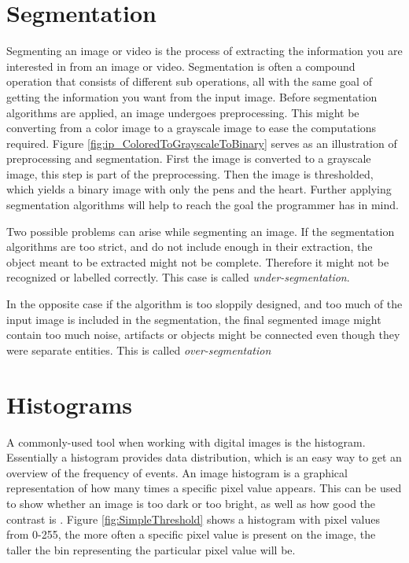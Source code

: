
\section{Segmentation}

Segmenting an image or video is the process of extracting the information you are interested in from an image or video. Segmentation is often a compound operation that consists of different sub operations, all with the same goal of getting the information you want from the input image. Before segmentation algorithms are applied, an image undergoes preprocessing. This might be converting from a color image to a grayscale image to ease the computations required. Figure \ref{fig:ip_ColoredToGrayscaleToBinary} serves as an illustration of preprocessing and segmentation. First the image is converted to a grayscale image, this step is part of the preprocessing. Then the image is thresholded, which yields a binary image with only the pens and the heart. Further applying segmentation algorithms will help to reach the goal the programmer has in mind.

Two possible problems can arise while segmenting an image. If the segmentation algorithms are too strict, and do not include enough in their extraction, the object meant to be extracted might not be complete. Therefore it might not be recognized or labelled correctly. This case is called \textit{under-segmentation}.

In the opposite case if the algorithm is too sloppily designed, and too much of the input image is included in the segmentation, the final segmented image might contain too much noise, artifacts or objects might be connected even though they were separate entities. This is called \textit{over-segmentation}

\section{Histograms}
A commonly-used tool when working with digital images is the histogram. Essentially a histogram provides data distribution, which is an easy way to get an overview of the frequency of events. An image histogram is a graphical representation of how many times a specific pixel value appears. This can be used to show whether an image is too dark or too bright, as well as how good the contrast is \citep{ip_book}. Figure \ref{fig:SimpleThreshold} shows a histogram with pixel values from 0-255, the more often a specific pixel value is present on the image, the taller the bin representing the particular pixel value will be.

